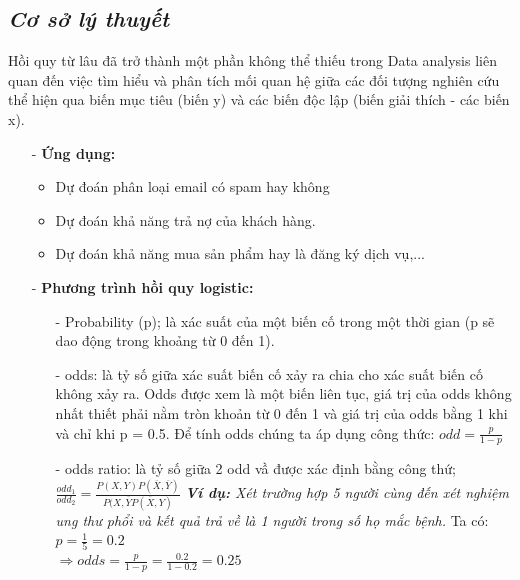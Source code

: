 \documentclass{report}
\newcommand\tab[1][1.25cm]{\hspace*{#1}}
\begin{document}
\subsection{\textit{Cơ sở lý thuyết}}
    \fontsize{13}{14}\selectfont
    Hồi quy từ lâu đã trở thành một phần không thể thiếu trong Data analysis liên quan đến việc tìm hiểu và phân tích mối quan hệ giữa các đối tượng nghiên cứu thể hiện qua biến mục tiêu (biến y) và các biến độc lập (biến giải thích - các biến x).
        \begin{enumerate}
                \item[- ]\textbf{ Ứng dụng:} 
                    \begin{itemize}
                        \item Dự đoán phân loại email có spam hay không
                        \item Dự đoán khả năng trả nợ của khách hàng.
                        \item Dự đoán khả năng mua sản phẩm hay là đăng ký dịch vụ,...
                    \end{itemize}
                \item [- ] \textbf{ Phương trình hồi quy logistic:}
\begin{enumerate}
        \item [- ] Probability (p); là xác suất của một biến cố trong một thời gian (p sẽ dao động trong khoảng từ 0 đến 1).
        \item [- ] odds: là tỷ số giữa xác suất biến cố xảy ra chia cho xác suất biến cố không xảy ra. Odds được xem là một biến liên tục, giá trị của odds không nhất thiết phải nằm tròn khoản từ 0 đến 1 và giá trị của odds bằng 1 khi và chỉ khi p = 0.5. Để tính odds chúng ta áp dụng công thức: $odd = \frac{p}{1 - p}$
        \item [- ] odds ratio: là tỷ số giữa 2 odd vầ được xác định bằng công thứ; $ \frac{odd_1}{odd_2} = \frac{P(X,Y)P(\overline{X},\overline{Y})}{P(X,\overline{Y}P(\overline{X},Y)}$
        \vspace{0.2cm}\tab\textit{\textbf{Ví dụ:} Xét trường hợp 5 người cùng đến xét nghiệm ung thư phổi và kết quả trả về là 1 người trong số họ mắc bệnh.}\vspace{0.2cm}
        \newline\tab\quad Ta có: $p = \frac{1}{5} = 0.2$\\
        \vspace{0.2cm}\newline\tab\quad$\Rightarrow odds = \frac{p}{1 - p} = \frac{0.2}{1-0.2} = 0.25$

\end{enumerate}
\end{enumerate}
\end{document}
